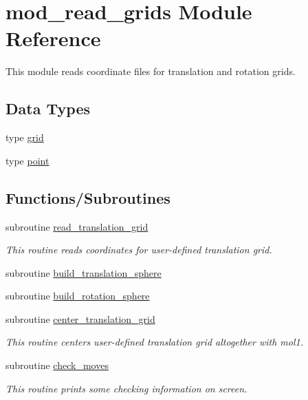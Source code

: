 \hypertarget{namespacemod__read__grids}{}\section{mod\+\_\+read\+\_\+grids Module Reference}
\label{namespacemod__read__grids}


This module reads coordinate files for translation and rotation grids.  


\subsection*{Data Types}
\begin{DoxyCompactItemize}
\item 
type \hyperlink{structmod__read__grids_1_1grid}{grid}
\item 
type \hyperlink{structmod__read__grids_1_1point}{point}
\end{DoxyCompactItemize}
\subsection*{Functions/\+Subroutines}
\begin{DoxyCompactItemize}
\item 
subroutine \hyperlink{namespacemod__read__grids_af6cb0bee8e3eb7dfbaa4621275b29fa2}{read\+\_\+translation\+\_\+grid}
\begin{DoxyCompactList}\small\item\em This routine reads coordinates for user-\/defined translation grid. \end{DoxyCompactList}\item 
subroutine \hyperlink{namespacemod__read__grids_abba14a1f750b2c342d5c5a80be803310}{build\+\_\+translation\+\_\+sphere}
\item 
subroutine \hyperlink{namespacemod__read__grids_ae4fb4c515f1f9f5edd3785ca0f509ea4}{build\+\_\+rotation\+\_\+sphere}
\item 
subroutine \hyperlink{namespacemod__read__grids_a1e081c6668bb3ea97788ffe4a74f39db}{center\+\_\+translation\+\_\+grid}
\begin{DoxyCompactList}\small\item\em This routine centers user-\/defined translation grid altogether with mol1. \end{DoxyCompactList}\item 
subroutine \hyperlink{namespacemod__read__grids_a318177c120a409fe4cef7d1785b626ac}{check\+\_\+moves}
\begin{DoxyCompactList}\small\item\em This routine prints some checking information on screen. \end{DoxyCompactList}\end{DoxyCompactItemize}
